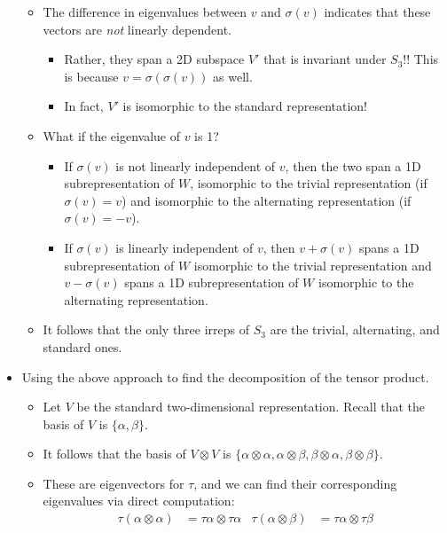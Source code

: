 \documentclass[../notes.tex]{subfiles}
\begin{document}
\begin{itemize}
\begin{itemize}
\begin{itemize}
        \end{itemize}
        \item The difference in eigenvalues between $v$ and $\sigma(v)$ indicates that these vectors are \emph{not} linearly dependent.
        \begin{itemize}
            \item Rather, they span a 2D subspace $V'$ that is invariant under $S_3$!! This is because $v=\sigma(\sigma(v))$ as well.
            \item In fact, $V'$ is isomorphic to the standard representation!
        \end{itemize}
        \item What if the eigenvalue of $v$ is 1?
        \begin{itemize}
            \item If $\sigma(v)$ is not linearly independent of $v$, then the two span a 1D subrepresentation of $W$, isomorphic to the trivial representation (if $\sigma(v)=v$) and isomorphic to the alternating representation (if $\sigma(v)=-v$).
            \item If $\sigma(v)$ is linearly independent of $v$, then $v+\sigma(v)$ spans a 1D subrepresentation of $W$ isomorphic to the trivial representation and $v-\sigma(v)$ spans a 1D subrepresentation of $W$ isomorphic to the alternating representation. 
        \end{itemize}
        \item It follows that the only three irreps of $S_3$ are the trivial, alternating, and standard ones.
    \end{itemize}
    \item Using the above approach to find the decomposition of the tensor product.
    \begin{itemize}
        \item Let $V$ be the standard two-dimensional representation. Recall that the basis of $V$ is $\{\alpha,\beta\}$.
        \item It follows that the basis of $V\otimes V$ is $\{\alpha\otimes\alpha,\alpha\otimes\beta,\beta\otimes\alpha,\beta\otimes\beta\}$.
        \item These are eigenvectors for $\tau$, and we can find their corresponding eigenvalues via direct computation:
        \begin{align*}
            \tau(\alpha\otimes\alpha) &= \tau\alpha\otimes\tau\alpha&
                \tau(\alpha\otimes\beta) &= \tau\alpha\otimes\tau\beta\\

\end{align*}
\end{itemize}
\end{itemize}
\end{document}
